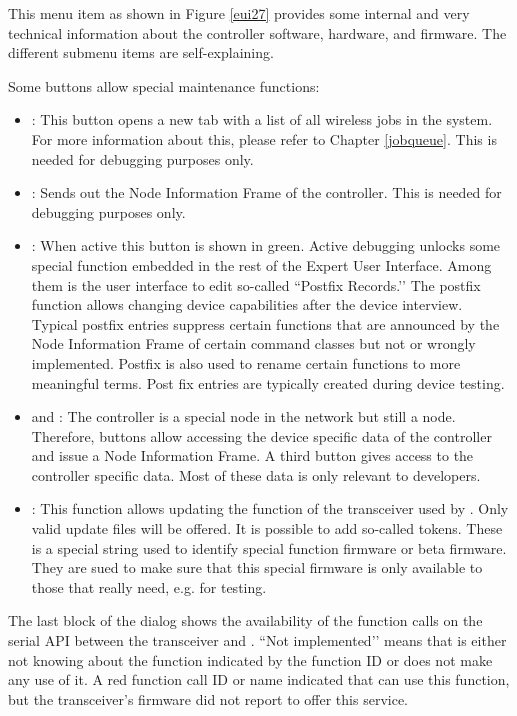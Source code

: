 This menu item as shown in Figure \ref{eui27} provides some internal and very technical 
information about the \zway controller software, hardware, and firmware. The different 
submenu items are self-explaining.

Some buttons allow special maintenance functions:

\begin{itemize}

\item {}: This button opens a new tab with a list of all wireless jobs in 
the system. For more information about this, please refer to Chapter \ref{jobqueue}. 
This is needed for debugging purposes only.
\item {}: Sends out the Node Information Frame of the \zway controller. 
This is needed for debugging purposes only.
\item {}: When active this button is shown in green. Active debugging unlocks 
some special function embedded in the rest of the Expert User Interface. Among them is the 
user interface to edit so-called ``Postfix Records.’’ The postfix function allows changing 
device capabilities after the device interview. Typical postfix entries suppress certain 
functions that are announced by the Node Information Frame of certain command classes but 
not or wrongly implemented. Postfix is also used to rename certain functions to more 
meaningful terms. Post fix entries are typically created during device testing.
\item {} and : The controller is a 
special node in the network but still a node. Therefore, buttons allow accessing the device 
specific data of the controller and issue a Node Information Frame. A third button gives 
access to the controller specific data. Most of these data is only relevant to developers.

\item {}: This function allows updating the function of the \zwave 
transceiver used by \zway. Only valid update files will be offered. It is possible to 
add so-called tokens. These is a special string used to identify special function 
firmware or beta firmware. They are sued to make sure that this special firmware is only 
available to those that really need, e.g. for testing.
\end{itemize}


The last block of the dialog shows the availability of the function calls on the serial 
API between the \zwave transceiver and \zway. ``Not implemented’’ means that \zway is 
either not knowing about the function indicated by the function ID or does not make any 
use of it. A red function call ID or name indicated that \zway can use this function, but 
the transceiver’s firmware did not report to offer this service.

